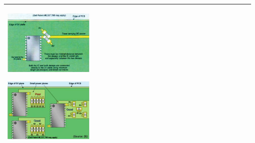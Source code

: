\begin{table}[h!]
\begin{tabular}{|m{}|m{}|}
					\begin{center}\includegraphics[width=0.35\textwidth]{images/ParallelC2.png}\end{center} 
					\begin{center}\includegraphics[width=0.35\textwidth]{images/ParallelC3.png}\end{center} 

			\\	
			\hline
			\end{tabular}
		\end{table}	
		
		
		
